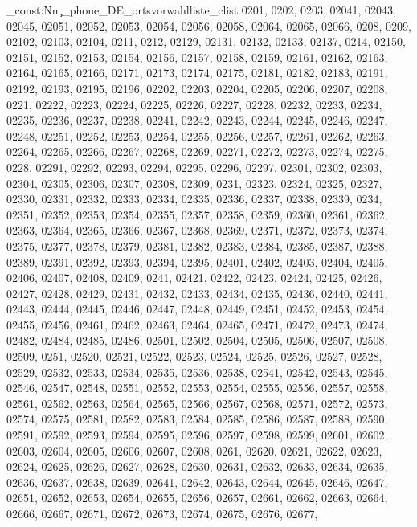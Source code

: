 \clist_const:Nn \c_phone_DE_ortsvorwahlliste_clist {0201,
0202,
0203,
02041,
02043,
02045,
02051,
02052,
02053,
02054,
02056,
02058,
02064,
02065,
02066,
0208,
0209,
02102,
02103,
02104,
0211,
0212,
02129,
02131,
02132,
02133,
02137,
0214,
02150,
02151,
02152,
02153,
02154,
02156,
02157,
02158,
02159,
02161,
02162,
02163,
02164,
02165,
02166,
02171,
02173,
02174,
02175,
02181,
02182,
02183,
02191,
02192,
02193,
02195,
02196,
02202,
02203,
02204,
02205,
02206,
02207,
02208,
0221,
02222,
02223,
02224,
02225,
02226,
02227,
02228,
02232,
02233,
02234,
02235,
02236,
02237,
02238,
02241,
02242,
02243,
02244,
02245,
02246,
02247,
02248,
02251,
02252,
02253,
02254,
02255,
02256,
02257,
02261,
02262,
02263,
02264,
02265,
02266,
02267,
02268,
02269,
02271,
02272,
02273,
02274,
02275,
0228,
02291,
02292,
02293,
02294,
02295,
02296,
02297,
02301,
02302,
02303,
02304,
02305,
02306,
02307,
02308,
02309,
0231,
02323,
02324,
02325,
02327,
02330,
02331,
02332,
02333,
02334,
02335,
02336,
02337,
02338,
02339,
0234,
02351,
02352,
02353,
02354,
02355,
02357,
02358,
02359,
02360,
02361,
02362,
02363,
02364,
02365,
02366,
02367,
02368,
02369,
02371,
02372,
02373,
02374,
02375,
02377,
02378,
02379,
02381,
02382,
02383,
02384,
02385,
02387,
02388,
02389,
02391,
02392,
02393,
02394,
02395,
02401,
02402,
02403,
02404,
02405,
02406,
02407,
02408,
02409,
0241,
02421,
02422,
02423,
02424,
02425,
02426,
02427,
02428,
02429,
02431,
02432,
02433,
02434,
02435,
02436,
02440,
02441,
02443,
02444,
02445,
02446,
02447,
02448,
02449,
02451,
02452,
02453,
02454,
02455,
02456,
02461,
02462,
02463,
02464,
02465,
02471,
02472,
02473,
02474,
02482,
02484,
02485,
02486,
02501,
02502,
02504,
02505,
02506,
02507,
02508,
02509,
0251,
02520,
02521,
02522,
02523,
02524,
02525,
02526,
02527,
02528,
02529,
02532,
02533,
02534,
02535,
02536,
02538,
02541,
02542,
02543,
02545,
02546,
02547,
02548,
02551,
02552,
02553,
02554,
02555,
02556,
02557,
02558,
02561,
02562,
02563,
02564,
02565,
02566,
02567,
02568,
02571,
02572,
02573,
02574,
02575,
02581,
02582,
02583,
02584,
02585,
02586,
02587,
02588,
02590,
02591,
02592,
02593,
02594,
02595,
02596,
02597,
02598,
02599,
02601,
02602,
02603,
02604,
02605,
02606,
02607,
02608,
0261,
02620,
02621,
02622,
02623,
02624,
02625,
02626,
02627,
02628,
02630,
02631,
02632,
02633,
02634,
02635,
02636,
02637,
02638,
02639,
02641,
02642,
02643,
02644,
02645,
02646,
02647,
02651,
02652,
02653,
02654,
02655,
02656,
02657,
02661,
02662,
02663,
02664,
02666,
02667,
02671,
02672,
02673,
02674,
02675,
02676,
02677,
}
